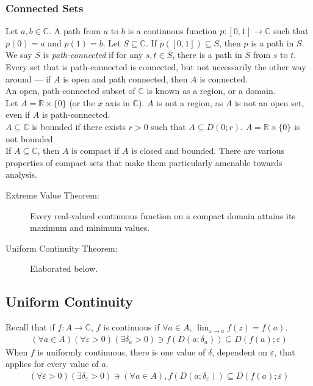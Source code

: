 \documentclass[10pt]{extarticle}
\newcommand{\R}{\mathbb{R}}
\newcommand{\C}{\mathbb{C}}
\begin{document}
  \subsubsection{Connected Sets}%
  Let $a,b\in\C$. A path from $a$ to $b$ is a continuous function $p:[0,1]\rightarrow \C$ such that $p(0) = a$ and $p(1) = b$. Let $S\subseteq \C$. If $p([0,1])\subseteq S$, then $p$ is a path in $S$.\\

  We say $S$ is \textit{path-connected} if for any $s,t\in S$, there is a path in $S$ from $s$ to $t$.\\

  Every set that is path-connected is connected, but not necessarily the other way around --- if $A$ is open and path connected, then $A$ is connected.\\

  An open, path-connected subset of $\C$ is known as a region, or a domain.\\

  Let $A = \R\times\{0\}$ (or the $x$ axis in $\C$). $A$ is not a region, as $A$ is not an open set, even if $A$ is path-connected.\\

  $A\subseteq \C$ is bounded if there exists $r > 0$ such that $A \subseteq D(0;r)$. $A = \R\times\{0\}$ is not bounded.\\

  If $A\subseteq \C$, then $A$ is compact if $A$ is closed and bounded. There are various properties of compact sets that make them particularly amenable towards analysis.
  \begin{description}
    \item[Extreme Value Theorem:] Every real-valued continuous function on a compact domain attains its maximum and minimum values.
    \item[Uniform Continuity Theorem:] Elaborated below.
  \end{description}
  \subsection{Uniform Continuity}%
  Recall that if $f: A\rightarrow \C$, $f$ is continuous if $\forall a\in A$, $\lim_{z\rightarrow a}f(z) = f(a)$.
  \begin{align*}
    (\forall a\in A)(\forall \varepsilon > 0)(\exists \delta_{a} > 0) \ni f(D(a;\delta_{a})) \subseteq D(f(a);\varepsilon)\tag*{$\delta$ depends on $a$}
  \end{align*}
  When $f$ is uniformly continuous, there is one value of $\delta$, dependent on $\varepsilon$, that applies for every value of $a$.
  \begin{align*}
    (\forall \varepsilon > 0)(\exists \delta_{\varepsilon} > 0) \ni (\forall a\in A), f(D(a;\delta_{\varepsilon}))\subseteq D(f(a);\varepsilon)
  \end{align*}
\end{document}
